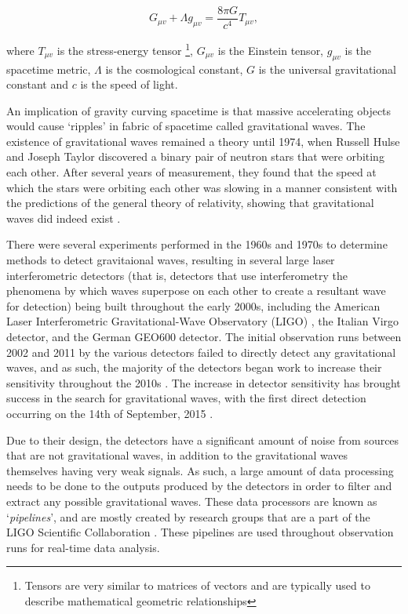 \documentclass{article}
\begin{document}
\begin{equation}
    G_{\mu{}v} + \Lambda{}g_{\mu{}v} = \dfrac{8\pi{}G}{c^4}T_{\mu{}v},
\end{equation}

where \(T_{\mu{}v}\) is the stress-energy tensor \footnote{Tensors are very similar to matrices of
vectors and are typically used to describe mathematical geometric relationships}, \(G_{\mu{}v}\) is
the Einstein tensor, \(g_{\mu{}v}\) is the spacetime metric, \(\Lambda\) is the cosmological
constant, \(G\) is the universal gravitational constant and \(c\) is the speed of light.

An implication of gravity curving spacetime is that massive accelerating objects would cause
`ripples' in fabric of spacetime called gravitational waves. The existence of gravitational waves
remained a theory until 1974, when Russell Hulse and Joseph Taylor discovered a binary pair of
neutron stars that were orbiting each other. After several years of measurement, they found that
the speed at which the stars were orbiting each other was slowing in a manner consistent with the
predictions of the general theory of relativity, showing that gravitational waves did indeed exist
\cite{GravDiscovery}.

There were several experiments performed in the 1960s and 1970s to determine methods to detect
gravitaional waves, resulting in several large laser interferometric detectors (that is, detectors
that use interferometry \textendash{} the phenomena by which waves superpose on each other to create
a resultant wave \textendash{} for detection) being built throughout the early 2000s, including the
American Laser Interferometric Gravitational-Wave Observatory (LIGO) \cite{LIGO}, the Italian Virgo
\cite{virgo} detector, and the German GEO600 detector. The initial observation runs between 2002 and
2011 by the various detectors failed to directly detect any gravitational waves, and as such, the
majority of the detectors began work to increase their sensitivity throughout the 2010s
\cite{aligo}.  The increase in detector sensitivity has brought success in the search for
gravitational waves, with the first direct detection occurring on the 14th of September, 2015
\cite{FirstDetectionPaper}\cite{DetectionWeb}.

Due to their design, the detectors have a significant amount of noise from sources that are not
gravitational waves, in addition to the gravitational waves themselves having very weak signals. As
such, a large amount of data processing needs to be done to the outputs produced by the detectors
in order to filter and extract any possible gravitational waves. These data processors are known as
`\textit{pipelines}', and are mostly created by research groups that are a part of the LIGO
Scientific Collaboration \cite{LSC}. These pipelines are used throughout observation runs for
real-time data analysis.
\end{document}
